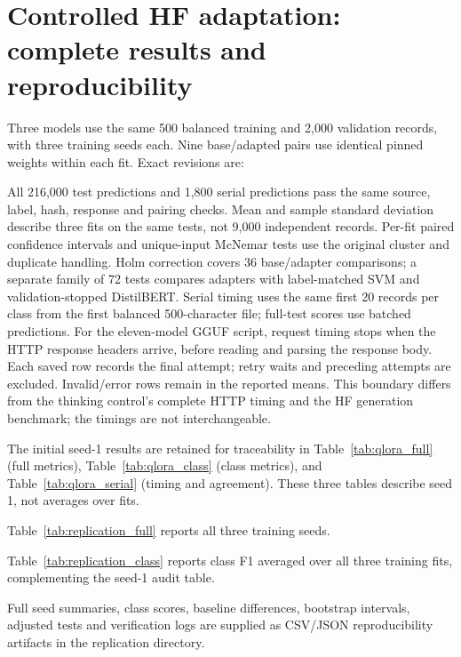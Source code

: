 \documentclass[11pt]{article}
\begin{document}
\section{Controlled HF adaptation: complete results and reproducibility}
Three models use the same 500 balanced training and 2,000 validation records,
with three training seeds each. Nine base/adapted pairs use identical
pinned weights within each fit. Exact revisions are:

All 216,000 test predictions and 1,800 serial predictions pass the same
source, label, hash, response and pairing checks. Mean and sample standard
deviation describe three fits on the same tests, not 9,000 independent
records. Per-fit paired confidence intervals and unique-input McNemar tests
use the original cluster and duplicate handling. Holm correction covers
36 base/adapter comparisons; a separate family of 72 tests compares
adapters with label-matched SVM and validation-stopped DistilBERT.
Serial timing uses the same first 20 records per class from the first
balanced 500-character file; full-test scores use batched predictions.
For the eleven-model GGUF script, request timing stops when the HTTP
response headers arrive, before reading and parsing the response body.
Each saved row records the final attempt; retry waits and preceding
attempts are excluded. Invalid/error rows remain in the reported means.
This boundary differs from the thinking control's complete HTTP timing
and the HF generation benchmark; the timings are not interchangeable.

The initial seed-1 results are retained for traceability in
Table~\ref{tab:qlora_full} (full metrics), Table~\ref{tab:qlora_class}
(class metrics), and Table~\ref{tab:qlora_serial} (timing and agreement).
These three tables describe seed 1, not averages over fits.

Table~\ref{tab:replication_full} reports all three training seeds.
\begingroup\scriptsize

\endgroup
Table~\ref{tab:replication_class} reports class F1 averaged over all
three training fits, complementing the seed-1 audit table.



Full seed summaries, class scores, baseline differences, bootstrap
intervals, adjusted tests and verification logs are supplied as CSV/JSON
reproducibility artifacts in the replication directory.
\clearpage
\end{document}
